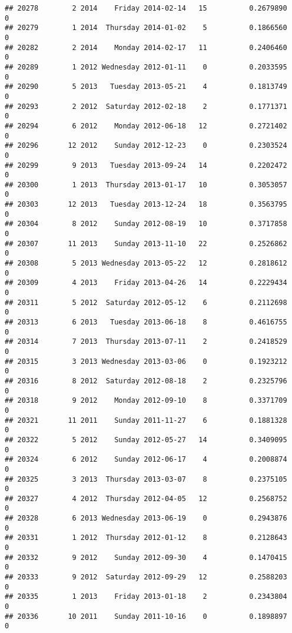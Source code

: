 \documentclass[
]{article}
\begin{document}
\begin{verbatim}
## 20278        2 2014    Friday 2014-02-14   15          0.2679890             0
## 20279        1 2014  Thursday 2014-01-02    5          0.1866560             0
## 20282        2 2014    Monday 2014-02-17   11          0.2406460             0
## 20289        1 2012 Wednesday 2012-01-11    0          0.2033595             0
## 20290        5 2013   Tuesday 2013-05-21    4          0.1813749             0
## 20293        2 2012  Saturday 2012-02-18    2          0.1771371             0
## 20294        6 2012    Monday 2012-06-18   12          0.2721402             0
## 20296       12 2012    Sunday 2012-12-23    0          0.2303524             0
## 20299        9 2013   Tuesday 2013-09-24   14          0.2202472             0
## 20300        1 2013  Thursday 2013-01-17   10          0.3053057             0
## 20303       12 2013   Tuesday 2013-12-24   18          0.3563795             0
## 20304        8 2012    Sunday 2012-08-19   10          0.3717858             0
## 20307       11 2013    Sunday 2013-11-10   22          0.2526862             0
## 20308        5 2013 Wednesday 2013-05-22   12          0.2818612             0
## 20309        4 2013    Friday 2013-04-26   14          0.2229434             0
## 20311        5 2012  Saturday 2012-05-12    6          0.2112698             0
## 20313        6 2013   Tuesday 2013-06-18    8          0.4616755             0
## 20314        7 2013  Thursday 2013-07-11    2          0.2418529             0
## 20315        3 2013 Wednesday 2013-03-06    0          0.1923212             0
## 20316        8 2012  Saturday 2012-08-18    2          0.2325796             0
## 20318        9 2012    Monday 2012-09-10    8          0.3371709             0
## 20321       11 2011    Sunday 2011-11-27    6          0.1881328             0
## 20322        5 2012    Sunday 2012-05-27   14          0.3409095             0
## 20324        6 2012    Sunday 2012-06-17    4          0.2008874             0
## 20325        3 2013  Thursday 2013-03-07    8          0.2375105             0
## 20327        4 2012  Thursday 2012-04-05   12          0.2568752             0
## 20328        6 2013 Wednesday 2013-06-19    0          0.2943876             0
## 20331        1 2012  Thursday 2012-01-12    8          0.2128643             0
## 20332        9 2012    Sunday 2012-09-30    4          0.1470415             0
## 20333        9 2012  Saturday 2012-09-29   12          0.2588203             0
## 20335        1 2013    Friday 2013-01-18    2          0.2343804             0
## 20336       10 2011    Sunday 2011-10-16    0          0.1898897             0

\end{verbatim}
\end{document}
